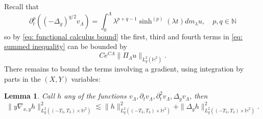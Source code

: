 \documentclass[letterpaper,11pt]{amsart}
\theoremstyle{note}
\newtheorem{lemma}[proposition]{Lemma}
\numberwithin{equation}{section}
\begin{document}
Recall that \begin{equation}\label{eq: spawning powers of lambda}\partial_t^p \left( (-\Delta_g)^{q/2} v_\Lambda \right) = \int_0^\Lambda \lambda^{p+q-1} \sinh^{(p)}(\lambda t) dm_\lambda u, \quad p, q \in \mathbb{N}\end{equation} so by \eqref{eq: functional calculus bound} the first, third and fourth terms in \eqref{eq: summed inequality} can be bounded by $$Ce^{C\Lambda} \| \Pi_\Lambda u \|_{L^2_g\left(\mathbb{H}^2\right)}.$$ There remains to bound the terms involving a gradient, using integration by parts in the $(X,Y)$ variables:

\begin{lemma}\label{lemma: gradient}
Call $h$ any of the functions $v_\Lambda, \partial_t v_\Lambda, \partial_t^2 v_\Lambda, \Delta_g v_\Lambda$, then $$\|y\nabla_{x,y} h \|_{L^2_g((-T_3, T_3) \times \mathbb{H}^2)}^2 \lesssim \|h\|_{L^2_g((-T_3, T_3) \times \mathbb{H}^2)}^2 + \|\Delta_g h\|_{L^2_g((-T_3,T_3) \times \mathbb{H}^2)}^2.$$\end{lemma}
\end{document}

